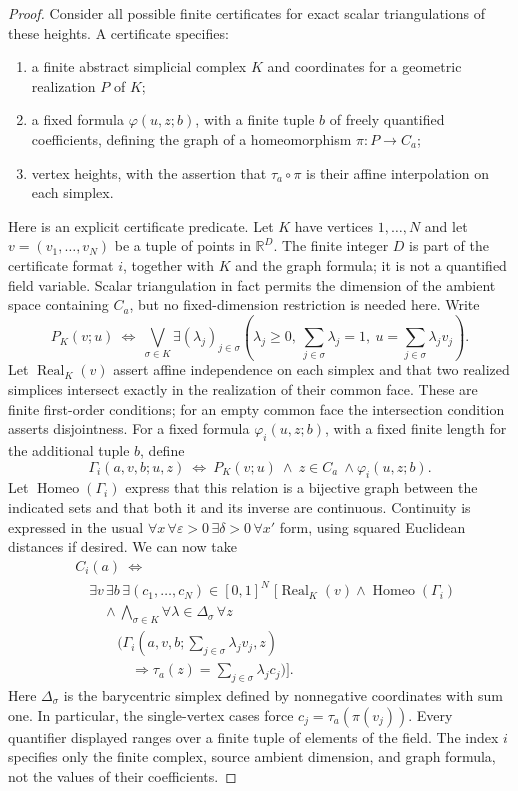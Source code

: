 \begin{proof}
Consider all possible finite certificates for exact scalar triangulations
of these heights. A certificate specifies:
\begin{enumerate}
\item a finite abstract simplicial complex $K$ and coordinates for a geometric
realization $P$ of $K$;
\item a fixed formula $\varphi(u,z;b)$, with a finite tuple $b$ of freely
quantified coefficients, defining the graph of a homeomorphism
$\pi:P\to C_a$;
\item vertex heights, with the assertion that $\tau_a\circ\pi$ is their
affine interpolation on each simplex.
\end{enumerate}
Here is an explicit certificate predicate. Let $K$ have vertices
$1,\ldots,N$ and let $v=(v_1,\ldots,v_N)$ be a tuple of points in
$\mathbb R^D$. The finite integer $D$ is part of the certificate format
$i$, together with $K$ and the graph formula; it is not a quantified field
variable. Scalar triangulation in fact permits the dimension of the ambient
space containing $C_a$, but no fixed-dimension restriction is needed here.
Write
\[
 P_K(v;u)\ \Longleftrightarrow\
 \bigvee_{\sigma\in K}\exists(\lambda_j)_{j\in\sigma}
 \left(\lambda_j\ge0,\ \sum_{j\in\sigma}\lambda_j=1,
       \ u=\sum_{j\in\sigma}\lambda_jv_j\right).
\]
Let $\operatorname{Real}_K(v)$ assert affine independence on each simplex
and that two realized simplices intersect exactly in the realization of
their common face. These are finite first-order conditions; for an empty
common face the intersection condition asserts disjointness. For a fixed
formula $\varphi_i(u,z;b)$, with a fixed finite length for the additional
tuple $b$, define
\[
 \Gamma_i(a,v,b;u,z)
 \ \Longleftrightarrow\
 P_K(v;u)\ \wedge\ z\in C_a\ \wedge\varphi_i(u,z;b).
\]
Let $\operatorname{Homeo}(\Gamma_i)$ express that this relation is a
bijective graph between the indicated sets and that both it and its
inverse are continuous. Continuity is expressed in the usual
$\forall x\,\forall\varepsilon>0\,\exists\delta>0\,\forall x'$
form, using squared Euclidean distances if desired. We can now take
\[
\begin{aligned}
 &C_i(a)\ \Longleftrightarrow\\
 &\quad\exists v\,\exists b\,\exists(c_1,\ldots,c_N)\in[0,1]^N\;
 \bigl[\operatorname{Real}_K(v)\wedge\operatorname{Homeo}(\Gamma_i)\\
 &\qquad{}\wedge\!\bigwedge_{\sigma\in K}
 \forall\lambda\in\Delta_\sigma\,\forall z\\
 &\qquad\quad\bigl(\Gamma_i(a,v,b;\textstyle\sum_{j\in\sigma}\lambda_jv_j,z)\\
 &\qquad\qquad\Rightarrow
 \tau_a(z)=\textstyle\sum_{j\in\sigma}\lambda_jc_j\bigr)\bigr].
\end{aligned}
\tag{A5.17.2a}
\]
Here $\Delta_\sigma$ is the barycentric simplex defined by nonnegative
coordinates with sum one. In particular, the single-vertex cases force
$c_j=\tau_a(\pi(v_j))$. Every quantifier displayed ranges over a finite
tuple of elements of the field. The index $i$ specifies only the finite
complex, source ambient dimension, and graph formula, not the values of
their coefficients.


\end{proof}
